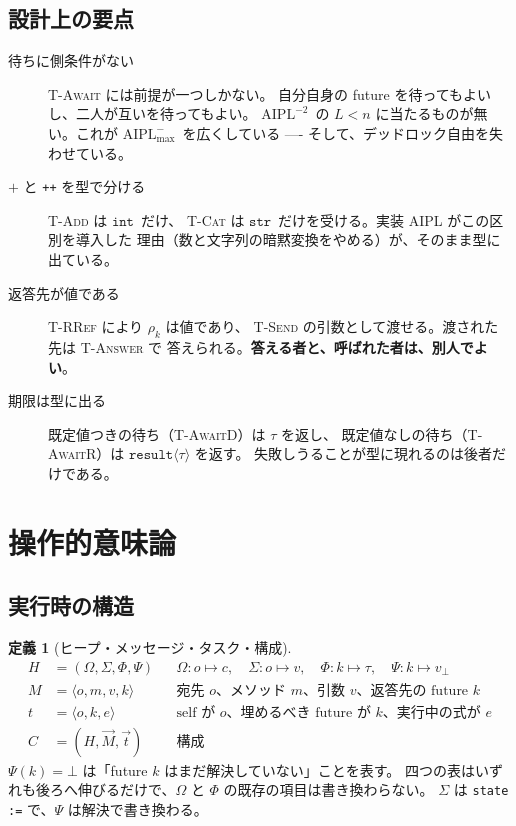 \documentclass[11pt,a4paper]{ltjsarticle}
\theoremstyle{definition}
\newtheorem{definition}[theorem]{定義}
\theoremstyle{remark}
\newcommand{\tint}{\ensuremath{\mathtt{int}}}
\newcommand{\tstr}{\ensuremath{\mathtt{str}}}
\newcommand{\tres}[1]{\ensuremath{\mathtt{result}\langle #1 \rangle}}
\newcommand{\Om}{\Omega}
\newcommand{\Sm}{\Sigma}
\newcommand{\Ph}{\Phi}
\newcommand{\Ps}{\Psi}
\newcommand{\Amax}{\ensuremath{\mathrm{AIPL}^{-}_{\max}}}
\newcommand{\Atwo}{\ensuremath{\mathrm{AIPL}^{-2}}}
\begin{document}
\subsection{設計上の要点}

\begin{description}
\item[待ちに側条件がない] \textsc{T-Await} には前提が一つしかない。
  自分自身の future を待ってもよいし、二人が互いを待ってもよい。
  \Atwo\ の $L < n$ に当たるものが無い。これが \Amax\ を広くしている
  ---- そして、デッドロック自由を失わせている。
\item[$+$ と \texttt{++} を型で分ける] \textsc{T-Add} は \tint\ だけ、
  \textsc{T-Cat} は \tstr\ だけを受ける。実装 AIPL がこの区別を導入した
  理由（数と文字列の暗黙変換をやめる）が、そのまま型に出ている。
\item[返答先が値である] \textsc{T-RRef} により $\rho_k$ は値であり、
  \textsc{T-Send} の引数として渡せる。渡された先は \textsc{T-Answer} で
  答えられる。\textbf{答える者と、呼ばれた者は、別人でよい}。
\item[期限は型に出る] 既定値つきの待ち（\textsc{T-AwaitD}）は $\tau$ を返し、
  既定値なしの待ち（\textsc{T-AwaitR}）は \tres{\tau} を返す。
  失敗しうることが型に現れるのは後者だけである。
\end{description}

\section{操作的意味論}

\subsection{実行時の構造}

\begin{definition}[ヒープ・メッセージ・タスク・構成]
\begin{align*}
H &= (\Om, \Sm, \Ph, \Ps) &&
  \Om : o \mapsto c,\quad \Sm : o \mapsto v,\quad
  \Ph : k \mapsto \tau,\quad \Ps : k \mapsto v_\bot \\
M &= \langle o, m, v, k\rangle && \text{宛先 $o$、メソッド $m$、引数 $v$、返答先の future $k$}\\
t &= \langle o, k, e\rangle && \text{self が $o$、埋めるべき future が $k$、実行中の式が $e$}\\
C &= (H, \vec{M}, \vec{t}) && \text{構成}
\end{align*}
$\Ps(k) = \bot$ は「future $k$ はまだ解決していない」ことを表す。
四つの表はいずれも後ろへ伸びるだけで、$\Om$ と $\Ph$ の既存の項目は書き換わらない。
$\Sm$ は \texttt{state :=} で、$\Ps$ は解決で書き換わる。
\end{definition}
\end{document}
